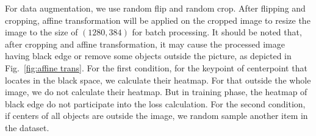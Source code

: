 \documentclass[journal]{IEEEtran}
\begin{document}
	For data augmentation, we use random flip and random crop. After flipping and cropping, affine transformation will be applied on the cropped image to resize the image to the size of $(1280, 384)$ for batch processing. It should be noted that, after cropping and affine transformation, it may cause the processed image having black edge or remove some objects outside the picture, as depicted in Fig.~\ref{fig:affine trans}. For the first condition, for the keypoint of centerpoint that locates in the black space, we calculate their heatmap. For that outside the whole image, we do not calculate their heatmap. But in training phase, the heatmap of black edge do not participate into the loss calculation. For the second condition, if centers of all objects are outside the image, we random sample another item in the dataset.
\begin{table}[]
	\centering
	\caption{{Car results on KITTI Testing Dataset}}
	\label{tab:kitti_test}
\end{table}
\end{document}
